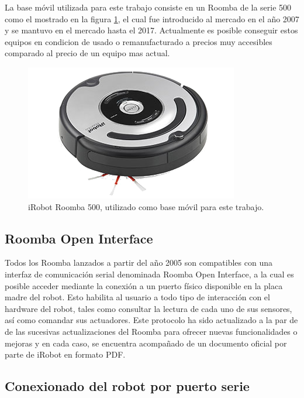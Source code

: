 La base móvil utilizada para este trabajo consiste en un Roomba de la serie 500 como el mostrado en la figura \ref{fig:roomba}, el cual fue introducido al mercado en el año 2007 y se mantuvo en el mercado hasta el 2017. Actualmente es posible conseguir estos equipos en condicion de usado o remanufacturado a precios muy accesibles comparado al precio de un equipo mas actual.

\begin{figure}[ht]
    \centering
    \includegraphics[scale=2.5]{./Figures/roomba.png}
    \caption{iRobot Roomba 500, utilizado como base móvil para este trabajo.\protect\footnotemark}
    \label{fig:roomba}
\end{figure}


\subsection{Roomba Open Interface}\label{sec:openInterface}
Todos los Roomba lanzados a partir del año 2005 son compatibles con una interfaz de comunicación serial denominada Roomba Open Interface, a la cual es posible acceder mediante la conexión a un puerto físico disponible en la placa madre del robot. Esto habilita al usuario a todo tipo de interacción con el hardware del robot, tales como consultar la lectura de cada uno de sus sensores, así como comandar sus actuadores. Este protocolo ha sido actualizado a la par de de las sucesivas actualizaciones del Roomba para ofrecer nuevas funcionalidades o mejoras y en cada caso, se encuentra acompañado de un documento oficial por parte de iRobot en formato PDF\protect\footnotemark.



\subsection{Conexionado del robot por puerto serie}

